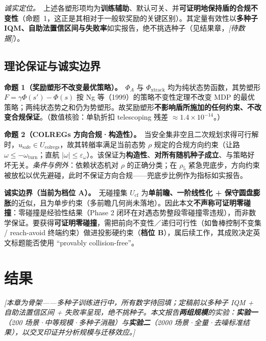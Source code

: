 \documentclass[12pt,letterpaper]{article}
\begin{document}
\textit{诚实定位。}\ 上述各塑形项均为\textbf{训练辅助}、默认可关、并\textbf{可证明地保持盾的合规不变性}（命题~1，这正是其相对于一般软奖励的关键区别）。其定量有效性以\textbf{多种子 IQM、自助法置信区间与失败率}如实报告，绝不挑选种子（见结果章，\textit{[待数据]}）。

\subsection{理论保证与诚实边界}
\textbf{命题 1（奖励塑形不改变最优策略）。}\ $\Phi_A$ 与 $\Phi_{\text{xtrack}}$ 均为纯状态势函数，其势塑形 $F=\gamma\Phi(s')-\Phi(s)$ 按 Ng 等（1999）的策略不变性定理不改变 MDP 的最优策略；两纯状态势之和仍为势塑形。故奖励塑形\textbf{不影响盾所施加的任何约束、不改变合规保证}。（数值核验：单轨折扣 telescoping 残差 $\approx1.4\times10^{-14}$。）

\textbf{命题 2（COLREGs 方向合规·构造性）。}\ 当安全集非空且二次规划求得可行解时，$u_{\text{safe}}\in U_{\text{colregs}}$，故其转艏率满足当前态势 $\rho$ 规定的合规方向约束（让路 $\omega\le-\omega_{\text{turn}}$；直航 $|\omega|\le\varepsilon_\omega$）。该保证为\textbf{构造性}、\textbf{对所有随机种子成立}、与策略好坏无关。\textit{条件与例外}：依赖状态机对 $\rho$ 的正确分类；在 $\rho_5$ 紧急兜底步，方向约束被放松以优先避碰，此时不保证方向合规——兜底步比例作为指标如实报告。

\textbf{诚实边界（当前为档位 A）。}\ 无碰撞集 $U_{\text{cf}}$ 为\textbf{单前瞻、一阶线性化 + 保守圆盘膨胀}的近似，且为单步约束（多前瞻几何尚未落地）。因此本文\textbf{不声称可证明零碰撞}：零碰撞是经验性结果（Phase 2 闭环在对遇态势整段零碰撞零违规），而非数学保证。要获得\textbf{可证明零碰撞}，需把前向不变性／递归可行性（如鲁棒控制不变集 / reach-avoid 终端约束）做进投影硬约束（\textbf{档位 B}），属后续工作，其成败决定英文标题能否使用 “provably collision-free”。

\section{结果}
\textit{[本章为骨架——多种子训练进行中，所有数字待回填；定稿前以多种子 IQM + 自助法置信区间 + 失败率呈现，绝不挑种子。本文报告\textbf{两组规模}的实验：\textbf{实验一}（200 场景·中等规模·多种子消融）与\textbf{实验二}（2000 场景·全量·去噪标准结果），以交叉印证并分析规模与迁移效应。]}
\end{document}
